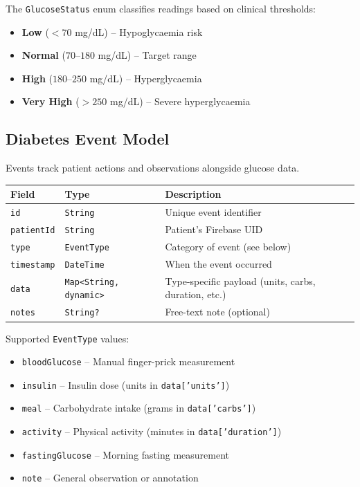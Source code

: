 \documentclass[12pt,a4paper]{article}
\begin{document}
The \texttt{GlucoseStatus} enum classifies readings based on clinical thresholds:
\begin{itemize}
    \item \textbf{Low} ($< 70$ mg/dL) -- Hypoglycaemia risk
    \item \textbf{Normal} ($70$--$180$ mg/dL) -- Target range
    \item \textbf{High} ($180$--$250$ mg/dL) -- Hyperglycaemia
    \item \textbf{Very High} ($> 250$ mg/dL) -- Severe hyperglycaemia
\end{itemize}

\subsection{Diabetes Event Model}

Events track patient actions and observations alongside glucose data.

\begin{longtable}{p{3.5cm} p{3cm} p{8cm}}
\toprule
\textbf{Field} & \textbf{Type} & \textbf{Description} \\
\midrule
\endhead
\texttt{id} & \texttt{String} & Unique event identifier \\
\texttt{patientId} & \texttt{String} & Patient's Firebase UID \\
\texttt{type} & \texttt{EventType} & Category of event (see below) \\
\texttt{timestamp} & \texttt{DateTime} & When the event occurred \\
\texttt{data} & \texttt{Map<String, dynamic>} & Type-specific payload (units, carbs, duration, etc.) \\
\texttt{notes} & \texttt{String?} & Free-text note (optional) \\
\bottomrule
\end{longtable}

Supported \texttt{EventType} values:
\begin{itemize}
    \item \texttt{bloodGlucose} -- Manual finger-prick measurement
    \item \texttt{insulin} -- Insulin dose (units in \texttt{data['units']})
    \item \texttt{meal} -- Carbohydrate intake (grams in \texttt{data['carbs']})
    \item \texttt{activity} -- Physical activity (minutes in \texttt{data['duration']})
    \item \texttt{fastingGlucose} -- Morning fasting measurement
    \item \texttt{note} -- General observation or annotation
\end{itemize}
\end{document}
